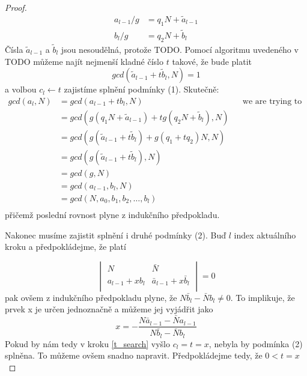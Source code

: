 \begin{proof}
\begin{equation}\label{division}
    \begin{split}
        a_{l - 1} / g & = q_1 N +  \tilde{a}_{l-1} \\
        b_{l} / g & = q_2 N +  \tilde{b}_{l}
    \end{split}
\end{equation}
Čísla $ \tilde{a}_{l-1} $ a $ \tilde{b}_{l} $ jsou nesoudělná, protože TODO. Pomocí
algoritmu uvedeného v TODO můžeme najít nejmenší kladné číslo $ t $ takové, že bude
platit
\begin{equation}\label{t_search}
    gcd(\tilde{a}_{l-1} + t \tilde{b}_{l}, N) = 1
\end{equation}
a volbou $ c_l \leftarrow t $ zajistíme splnění podmínky (1). Skutečně:
\begin{align*}
    gcd(a_l, N) &= gcd(a_{l-1} + t b_l, N) && \text{we are trying to solve for } \\
                &= gcd(g (q_1 N +  \tilde{a}_{l-1})
                        + tg(q_2 N + \tilde{b}_{l}), N) \\
                &= gcd(g (\tilde{a}_{l-1} + t \tilde{b}_{l})
                        + g (q_1 + t q_2) N, N) \\
                &= gcd(g (\tilde{a}_{l-1} + t \tilde{b}_{l}), N) \\
                &= gcd(g, N) \\
                &= gcd(a_{l-1}, b_l, N) \\
                &= gcd(N, a_0, b_1, b_2, \dots, b_l) \\
\end{align*}
přičemž poslední rovnost plyne z indukčního předpokladu.

Nakonec musíme zajistit splnění i druhé podmínky (2). Buď $ l $ index aktuálního
kroku a předpokládejme, že platí

\begin{equation}\label{det}
    \begin{vmatrix}
        N & \bar{N} \\
        a_{l-1} + x b_l & \bar{a}_{l-1} + x \bar{b}_l  \\
    \end{vmatrix}
    = 0
\end{equation}
pak ovšem z indukčního předpokladu plyne, že $ N \bar{b}_l - \bar{N} b_l \neq 0 $.
To implikuje, že prvek x je určen jednoznačně a můžeme jej vyjádřit jako
\begin{equation}\label{frac}
    x = -\frac{N \bar{a}_{l-1} - \bar{N} a_{l-1}} {N \bar{b}_l - \bar{N} b_l}
\end{equation}
Pokud by nám tedy v kroku \ref{t_search} vyšlo $ c_l = t = x $, nebyla by podmínka
(2) splněna. To můžeme ovšem snadno napravit. Předpokládejme tedy, že $ 0 < t = x $
\end{proof}



